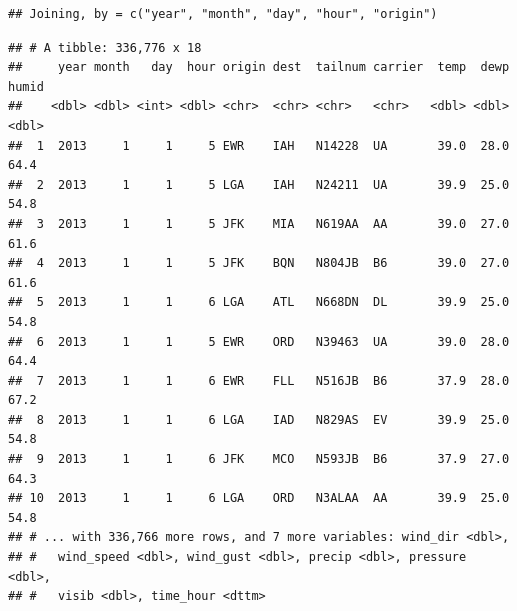 \documentclass[]{book}
\newenvironment{Shaded}{\begin{snugshade}}{\end{snugshade}}
\newcommand{\KeywordTok}[1]{\textcolor[rgb]{0.13,0.29,0.53}{\textbf{#1}}}
\newcommand{\DataTypeTok}[1]{\textcolor[rgb]{0.13,0.29,0.53}{#1}}
\newcommand{\StringTok}[1]{\textcolor[rgb]{0.31,0.60,0.02}{#1}}
\newcommand{\CommentTok}[1]{\textcolor[rgb]{0.56,0.35,0.01}{\textit{#1}}}
\newcommand{\OperatorTok}[1]{\textcolor[rgb]{0.81,0.36,0.00}{\textbf{#1}}}
\newcommand{\NormalTok}[1]{#1}
\theoremstyle{definition}
\theoremstyle{definition}
\theoremstyle{definition}
\theoremstyle{remark}
\begin{document}
\begin{Shaded}
\end{Shaded}

\begin{verbatim}
## Joining, by = c("year", "month", "day", "hour", "origin")
\end{verbatim}

\begin{verbatim}
## # A tibble: 336,776 x 18
##     year month   day  hour origin dest  tailnum carrier  temp  dewp humid
##    <dbl> <dbl> <int> <dbl> <chr>  <chr> <chr>   <chr>   <dbl> <dbl> <dbl>
##  1  2013     1     1     5 EWR    IAH   N14228  UA       39.0  28.0  64.4
##  2  2013     1     1     5 LGA    IAH   N24211  UA       39.9  25.0  54.8
##  3  2013     1     1     5 JFK    MIA   N619AA  AA       39.0  27.0  61.6
##  4  2013     1     1     5 JFK    BQN   N804JB  B6       39.0  27.0  61.6
##  5  2013     1     1     6 LGA    ATL   N668DN  DL       39.9  25.0  54.8
##  6  2013     1     1     5 EWR    ORD   N39463  UA       39.0  28.0  64.4
##  7  2013     1     1     6 EWR    FLL   N516JB  B6       37.9  28.0  67.2
##  8  2013     1     1     6 LGA    IAD   N829AS  EV       39.9  25.0  54.8
##  9  2013     1     1     6 JFK    MCO   N593JB  B6       37.9  27.0  64.3
## 10  2013     1     1     6 LGA    ORD   N3ALAA  AA       39.9  25.0  54.8
## # ... with 336,766 more rows, and 7 more variables: wind_dir <dbl>,
## #   wind_speed <dbl>, wind_gust <dbl>, precip <dbl>, pressure <dbl>,
## #   visib <dbl>, time_hour <dttm>
\end{verbatim}

\begin{Shaded}
\end{Shaded}
\end{document}
